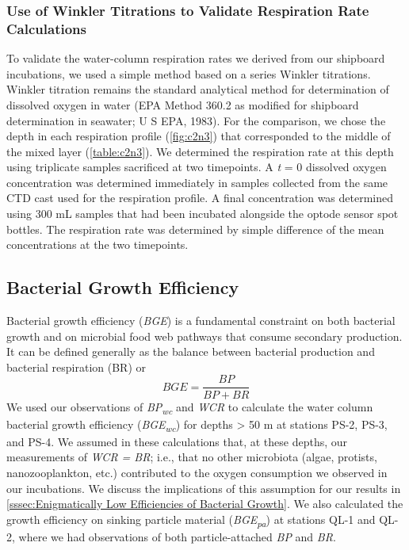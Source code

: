 \subsubsection{Use of Winkler Titrations to Validate Respiration Rate Calculations}

To validate the water-column respiration rates we derived from our shipboard incubations, we used a simple method based on a series Winkler titrations. Winkler titration remains the standard analytical method for determination of dissolved oxygen in water (EPA Method 360.2 as modified for shipboard determination in seawater; U S EPA, 1983). For the comparison, we chose the depth in each respiration profile (\autoref{fig:c2n3}) that corresponded to the middle of the mixed layer (\autoref{table:c2n3}). We determined the respiration rate at this depth using triplicate samples sacrificed at two timepoints. A \emph{t} = 0 dissolved oxygen concentration was determined immediately in samples collected from the same CTD cast used for the respiration profile. A final concentration was determined using 300 mL samples that had been incubated alongside the optode sensor spot bottles. The respiration rate was determined by simple difference of the mean concentrations at the two timepoints.

\subsection{Bacterial Growth Efficiency}

Bacterial growth efficiency (\emph{BGE}) is a fundamental constraint on both bacterial growth and on microbial food web pathways that consume secondary production. It can be defined generally as the balance between bacterial production and bacterial respiration (BR) or
\begin{equation} \label{eq:c2e4}
BGE = \frac{{BP}}{{BP + BR}}
\end{equation}
We used our observations of \emph{BP\textsubscript{wc}} and \emph{WCR} to calculate the water column bacterial growth efficiency (\emph{BGE\textsubscript{wc}}) for depths \textgreater{} 50 m at stations PS-2, PS-3, and PS-4. We assumed in these calculations that, at these depths, our measurements of \emph{WCR = BR}; i.e., that no other microbiota (algae, protists, nanozooplankton, etc.) contributed to the oxygen consumption we observed in our incubations. We discuss the implications of this assumption for our results in \autoref{sssec:Enigmatically Low Efficiencies of Bacterial Growth}. We also calculated the growth efficiency on sinking particle material (\emph{BGE\textsubscript{pa}}) at stations QL-1 and QL-2, where we had observations of both particle-attached \emph{BP} and \emph{BR}.

